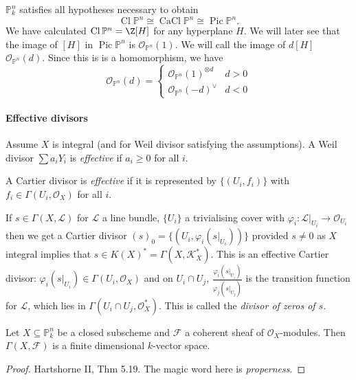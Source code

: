 \documentclass[a4paper]{article}
\renewcommand*{\P}{\mathbb{P}}
\newcommand{\sh}[1]{\mathcal{#1}} %
\DeclareMathOperator{\Pic}{Pic} %
\DeclareMathOperator{\Cl}{Cl} %
\DeclareMathOperator{\CaCl}{CaCl} %
\begin{document}
\begin{eg}
  \(\P_k^n\) satisfies all hypotheses necessary to obtain
  \[
    \Cl \P^n \cong \CaCl \P^n \cong \Pic \P^n.
  \]
  We have calculated \(\Cl \P^n = \Z[H]\) for any hyperplane \(H\). We will later see that the image of \([H]\) in \(\Pic \P^n\) is \(\sh O_{\P^n}(1)\). We will call the image of \(d [H]\) \(\sh O_{\P^n}(d)\). Since this is is a homomorphism, we have
  \[
    \sh O_{\P^n}(d) =
    \begin{cases}
      \sh O_{\P^n}(1)^{\otimes d} & d > 0 \\
      \sh O_{\P^n}(-d)^\vee & d < 0
    \end{cases}
  \]
\end{eg}

\paragraph{Effective divisors}

\begin{definition}
  Assume \(X\) is integral (and for Weil divisor satisfying the assumptions). A Weil divisor \(\sum a_i Y_i\) is \emph{effective} if \(a_i \geq 0\) for all \(i\).

  A Cartier divisor is \emph{effective} if it is represented by \(\{(U_i, f_i)\}\) with \(f_i \in \Gamma(U_i, \sh O_X)\) for all \(i\).
\end{definition}

If \(s \in \Gamma(X, \sh L)\) for \(\sh L\) a line bundle, \(\{U_i\}\) a trivialising cover with \(\varphi_i: \sh L|_{U_i} \to \sh O_{U_i}\) then we get a Cartier divisor \((s)_0 = \{(U_i, \varphi_i(s|_{U_i}))\}\) provided \(s \neq 0\) as \(X\) integral implies that \(s \in K(X)^* = \Gamma(X, \sh K_X^*)\). This is an effective Cartier divisor: \(\varphi_i(s|_{U_i}) \in \Gamma(U_i, \sh O_X)\) and on \(U_i \cap U_j\), \(\frac{\varphi_i(s|_{U_i})}{\varphi_j(s|_{U_j})}\) is the transition function for \(\sh L\), which lies in \(\Gamma(U_i \cap U_j, \sh O_X^*)\). This is called the \emph{divisor of zeros of \(s\)}.

\begin{theorem}
  Let \(X \subseteq \P^n_k\) be a closed subscheme and \(\sh F\) a coherent sheaf of \(\sh O_X\)-modules. Then \(\Gamma(X, \sh F)\) is a finite dimensional \(k\)-vector space.
\end{theorem}

\begin{proof}
  Hartshorne II, Thm 5.19. The magic word here is \emph{properness}.
\end{proof}
\end{document}
